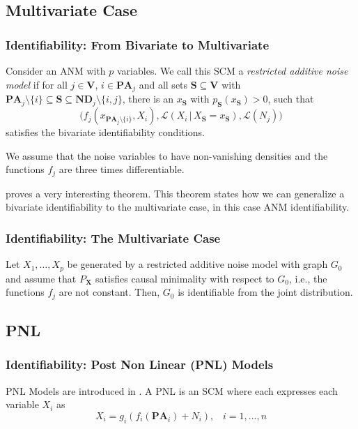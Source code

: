 \documentclass{beamer}
\newcommand{\B}[1]{\mathbf{#1}}
\newcommand{\PA}[2][]{{\B{PA}}^{#1}_{#2}}
\newcommand{\ND}[2][]{{\B{ND}}^{#1}_{#2}}
\newcommand{\given}{\,|\,}
\newcommand{\law}[1]{\mathcal{L}({#1})}
\begin{document}
\subsection{Multivariate Case}
\begin{frame}
\frametitle{Identifiability: From Bivariate to Multivariate}
\begin{definition} \label{def:wnn}
	Consider an ANM with $p$ variables. We call this SCM a \emph{restricted additive noise model} if for all $j \in \B{V}$, $i \in \PA{j}$ and all sets  $\B{S} \subseteq \B{V}$ with  $\PA{j} \setminus \{i\} \subseteq \B{S} \subseteq \ND{j} \setminus \{i,j\}$, there is an $x_{\B{S}}$ with $p_{\B{S}}(x_{\B{S}}) > 0$, such that
	\begin{equation*}
	\Big(f_j(x_{\PA{j}\setminus \{i\}}, X_i), \law{X_i \given X_{\B{S}}=x_{\B{S}}}, \law{N_j}\Big)
	\end{equation*}
	satisfies the bivariate identifiability conditions.
	
	We assume that the noise variables to have non-vanishing densities and the functions $f_j$ are three times differentiable.
\end{definition}
\end{frame}

\begin{frame}
\cite{continous} proves a very interesting theorem. This theorem states how we can generalize a bivariate identifiability to the multivariate case, in this case ANM identifiability.
\frametitle{Identifiability: The Multivariate Case}
\begin{theorem}
	 Let $X_1, \ldots, X_p$ be generated by a restricted additive noise model with graph $G_0$ and assume that $P_\mathbf{X}$ satisfies causal minimality with respect to $G_0$, i.e., the functions $f_j$ are not constant. Then, $G_0$ is identifiable from the joint distribution.
\end{theorem}
\end{frame}
\subsection{PNL}
\begin{frame}
\frametitle{Identifiability: Post Non Linear (PNL) Models}
\begin{definition}
PNL Models are introduced in \cite{postnonlinear}. A PNL is an SCM where each expresses each variable $X_i$ as
$$X_i=g_i(f_i(\PA i) +N_i),\;\;\;  i= 1, ..., n$$
\end{definition}
\end{frame}
\end{document}
